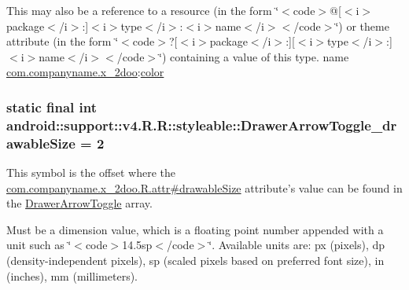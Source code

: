 This may also be a reference to a resource (in the form \char`\"{}$<$code$>$@\mbox{[}$<$i$>$package$<$/i$>$:\mbox{]}$<$i$>$type$<$/i$>$:$<$i$>$name$<$/i$>$$<$/code$>$\char`\"{}) or theme attribute (in the form \char`\"{}$<$code$>$?\mbox{[}$<$i$>$package$<$/i$>$:\mbox{]}\mbox{[}$<$i$>$type$<$/i$>$:\mbox{]}$<$i$>$name$<$/i$>$$<$/code$>$\char`\"{}) containing a value of this type.  name \hyperlink{namespacecom_1_1companyname_1_1x__2doo}{com.companyname.x\_\-2doo}:\hyperlink{classandroid_1_1support_1_1v4_1_1_r_1_1color}{color} \hypertarget{classandroid_1_1support_1_1v4_1_1_r_1_1styleable_307f755b60bc3d3a3914d600013df9db}{
\subsubsection[{DrawerArrowToggle\_\-drawableSize}]{\setlength{\rightskip}{0pt plus 5cm}static final int android::support::v4.R.R::styleable::DrawerArrowToggle\_\-drawableSize = 2}}
\label{classandroid_1_1support_1_1v4_1_1_r_1_1styleable_307f755b60bc3d3a3914d600013df9db}


This symbol is the offset where the \hyperlink{classcom_1_1companyname_1_1x__2doo_1_1_r_1_1attr_fea0fa003a6eac23288f7e98c0d2f6ee}{com.companyname.x\_\-2doo.R.attr\#drawableSize} attribute's value can be found in the \hyperlink{classandroid_1_1support_1_1v4_1_1_r_1_1styleable_df2952a999161d3c408fb6267800afe6}{DrawerArrowToggle} array.

Must be a dimension value, which is a floating point number appended with a unit such as \char`\"{}$<$code$>$14.5sp$<$/code$>$\char`\"{}. Available units are: px (pixels), dp (density-independent pixels), sp (scaled pixels based on preferred font size), in (inches), mm (millimeters). 

